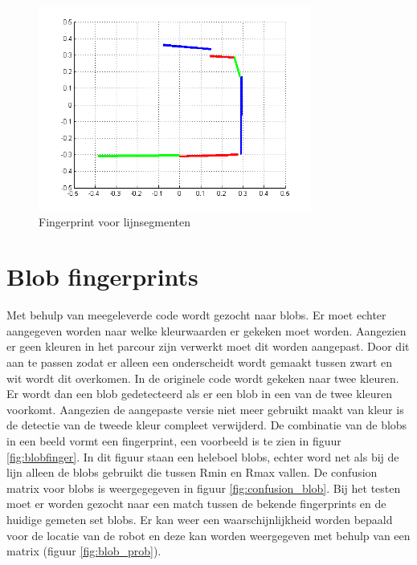 \documentclass[a4paper]{article}
\begin{document}
\begin{figure}[h]
	\centering
	\includegraphics[width=0.8\textwidth]{fingerprint.png}
	\caption{Fingerprint voor lijnsegmenten}
	\label{fig:lijnfinger}
\end{figure}


\section{Blob fingerprints}
Met behulp van meegeleverde code wordt gezocht naar blobs. Er moet echter aangegeven worden naar welke kleurwaarden er gekeken moet worden. Aangezien er geen kleuren in het parcour zijn verwerkt moet dit worden aangepast. Door dit aan te passen zodat er alleen een onderscheidt wordt gemaakt tussen zwart en wit wordt dit overkomen. In de originele code wordt gekeken naar twee kleuren. Er wordt dan een blob gedetecteerd als er een blob in een van de twee kleuren voorkomt.  Aangezien de aangepaste versie niet meer gebruikt maakt van kleur is de detectie van de tweede kleur compleet verwijderd. 
De combinatie van de blobs in een beeld vormt een fingerprint, een voorbeeld is te zien in figuur \ref{fig:blobfinger}. In dit figuur staan een heleboel blobs, echter word net als bij de lijn alleen de blobs gebruikt die tussen Rmin en Rmax vallen. 
De confusion matrix voor blobs is weergegegeven in figuur \ref{fig:confusion_blob}.
Bij het testen moet er worden gezocht naar een match tussen de bekende fingerprints en de huidige gemeten set blobs. Er kan weer een waarschijnlijkheid worden bepaald voor de locatie van de robot en deze kan worden weergegeven met behulp van een matrix (figuur \ref{fig:blob_prob}).
\end{document}
